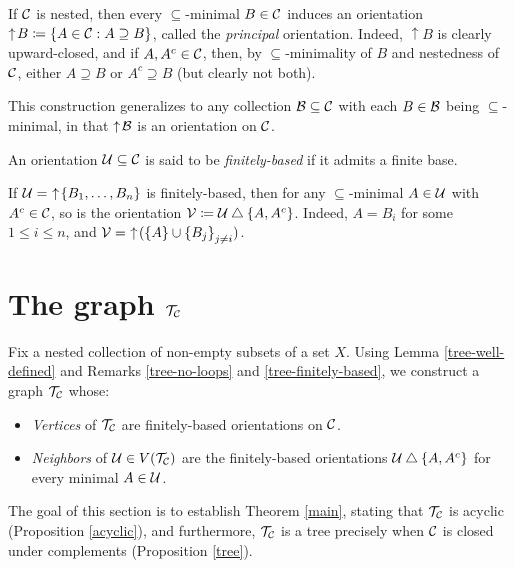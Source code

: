 \documentclass{amsart}
\begin{document}
    \begin{remark}
        If $\mathcal{C}$ is nested, then every $\subseteq$-minimal $B\in\mathcal{C}$ induces an orientation $\uparrow\!B\coloneqq\left\{A\in\mathcal{C}: A\supseteq B\right\}$, called the \textit{principal} orientation. Indeed, $\uparrow\!B$ is clearly upward-closed, and if $A,A^c\in\mathcal{C}$, then, by $\subseteq$-minimality of $B$ and nestedness of $\mathcal{C}$, either $A\supseteq B$ or $A^c\supseteq B$ (but clearly not both).

        This construction generalizes to any collection $\mathcal{B}\subseteq\mathcal{C}$ with each $B\in\mathcal{B}$ being $\subseteq$-minimal, in that $\uparrow\!\mathcal{B}$ is an orientation on $\mathcal{C}$.
    \end{remark}

    \begin{definition}
        An orientation $\mathcal{U}\subseteq\mathcal{C}$ is said to be \textit{finitely-based} if it admits a finite base.
    \end{definition}

    \begin{remark}\label{tree-finitely-based}
        If $\mathcal{U}=\,\,\uparrow\!\left\{B_1,\dots,B_n\right\}$ is finitely-based, then for any $\subseteq$-minimal $A\in\mathcal{U}$ with $A^c\in\mathcal{C}$, so is the orientation $\mathcal{V}\coloneqq\mathcal{U}\bigtriangleup\left\{A,A^c\right\}$. Indeed, $A=B_i$ for some $1\leq i\leq n$, and $\mathcal{V}=\,\,\uparrow\!(\left\{A\right\}\cup\left\{B_j\right\}_{j\neq i})$.
    \end{remark}

    \section{The graph $\mathcal{T}_{\mathcal{C}}$}

    Fix a nested collection of non-empty subsets of a set $X$. Using Lemma \ref{tree-well-defined} and Remarks \ref{tree-no-loops} and \ref{tree-finitely-based}, we construct a graph $\mathcal{T}_{\mathcal{C}}$ whose:
    \begin{itemize}
        \item \textit{Vertices} of $\mathcal{T}_{\mathcal{C}}$ are finitely-based orientations on $\mathcal{C}$.
        \item \textit{Neighbors} of $\mathcal{U}\in V(\mathcal{T}_{\mathcal{C}})$ are the finitely-based orientations $\mathcal{U}\bigtriangleup\left\{A,A^c\right\}$ for every minimal $A\in\mathcal{U}$.
    \end{itemize}

    The goal of this section is to establish Theorem \ref{main}, stating that $\mathcal{T}_{\mathcal{C}}$ is acyclic (Proposition \ref{acyclic}), and furthermore, $\mathcal{T}_{\mathcal{C}}$ is a tree precisely when $\mathcal{C}$ is closed under complements (Proposition \ref{tree}).
\end{document}
